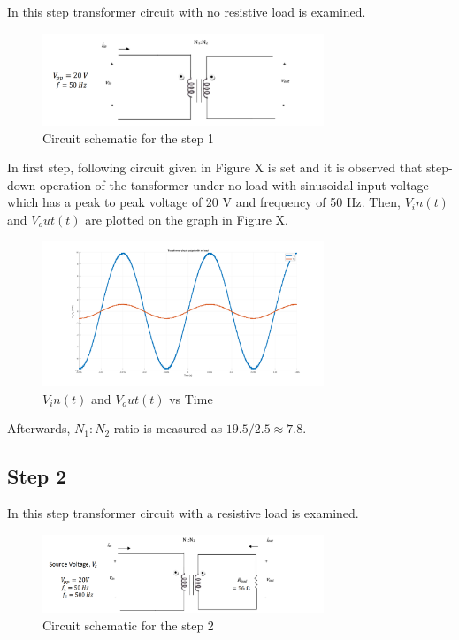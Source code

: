 \documentclass[letterpaper,12pt]{article}
\begin{document}
In this step transformer circuit with no resistive load is examined. 
\begin{figure}[H]
    \centering
    \includegraphics[width = 0.75\textwidth]{1.png}
    \caption{Circuit schematic for the step 1}
\end{figure} 
    
In first step, following circuit given in Figure X is set and it is observed that step-down operation of the tansformer under no load with sinusoidal input voltage which has a peak to peak voltage of 20 V and frequency of
50 Hz. Then, \(V_in(t) \) and \(V_out(t)\) are plotted on the graph in Figure X.
\begin{figure}[H]
    \centering
    \includegraphics[width = 0.75\textwidth]{1_1.png}
    \caption{\(V_in(t) \) and \(V_out(t)\) vs Time}
\end{figure} 
Afterwards, \(N_1:N_2\) ratio is measured as \(19.5/2.5 \approx 7.8 \).

%
\subsection{Step 2}
In this step transformer circuit with a resistive load is examined.
\begin{figure}[H]
    \centering
    \includegraphics[width = 0.75\textwidth]{2.png}
    \caption{Circuit schematic for the step 2}
\end{figure} 
\end{document}
